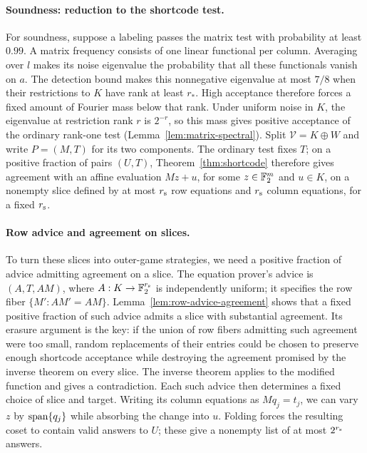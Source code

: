 \paragraph{Soundness: reduction to the shortcode test.}
For soundness, suppose a labeling passes the matrix test with probability
at least \(0.99\). A matrix frequency consists of one linear functional
per column. Averaging over \(l\) makes its noise eigenvalue the probability
that all these functionals vanish on \(a\). The detection bound makes
this nonnegative eigenvalue at most \(7/8\) when their restrictions to
\(K\) have rank at least \(r_*\). High acceptance therefore forces a
fixed amount of Fourier mass below that rank. Under uniform noise in
\(K\), the eigenvalue at restriction rank \(r\) is \(2^{-r}\), so this
mass gives positive acceptance of the ordinary rank-one test
(Lemma~\ref{lem:matrix-spectral}). Split \(\mathcal V=K\oplus W\) and
write \(P=(M,T)\) for its two components. The ordinary test fixes \(T\);
on a positive fraction of pairs \((U,T)\), Theorem~\ref{thm:shortcode}
therefore gives agreement with an affine evaluation \(Mz+u\), for some
\(z\in\mathbb F_2^m\) and \(u\in K\), on a nonempty slice defined by at most
\(r_{\rm s}\) row equations and \(r_{\rm s}\) column equations, for a
fixed \(r_{\rm s}\).

\paragraph{Row advice and agreement on slices.}
To turn these slices into outer-game strategies, we need a positive
fraction of advice admitting agreement on a slice. The equation prover's advice is
\((A,T,AM)\), where \(A:K\to\mathbb F_2^{r_{\rm s}}\) is independently
uniform; it specifies the row fiber \(\{M':AM'=AM\}\).
Lemma~\ref{lem:row-advice-agreement} shows that a fixed positive fraction of
such advice admits a slice with substantial agreement. Its erasure
argument is the key: if the union of row fibers admitting such agreement were too small,
random replacements of their entries could be chosen to preserve enough
shortcode acceptance while destroying the agreement promised by the
inverse theorem on every slice.
The inverse theorem applies to the modified function and gives a
contradiction. Each such advice then determines a fixed choice of
slice and target. Writing its column equations as \(Mq_j=t_j\), we can
vary \(z\) by \(\operatorname{span}\{q_j\}\) while absorbing the change into \(u\).
Folding forces the resulting coset to contain valid answers to \(U\);
these give a nonempty list of at most \(2^{r_{\rm s}}\) answers.


